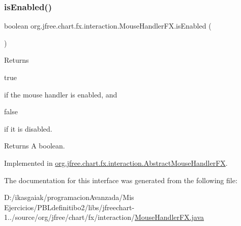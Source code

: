 \subsubsection{\texorpdfstring{is\+Enabled()}{isEnabled()}}
{\footnotesize\ttfamily boolean org.\+jfree.\+chart.\+fx.\+interaction.\+Mouse\+Handler\+F\+X.\+is\+Enabled (\begin{DoxyParamCaption}{ }\end{DoxyParamCaption})}

Returns
\begin{DoxyCode}
\textcolor{keyword}{true} 
\end{DoxyCode}
 if the mouse handler is enabled, and 
\begin{DoxyCode}
\textcolor{keyword}{false} 
\end{DoxyCode}
 if it is disabled.

\begin{DoxyReturn}{Returns}
A boolean. 
\end{DoxyReturn}


Implemented in \mbox{\hyperlink{classorg_1_1jfree_1_1chart_1_1fx_1_1interaction_1_1_abstract_mouse_handler_f_x_a231b7ea733036ba44a5c610184f5b1b0}{org.\+jfree.\+chart.\+fx.\+interaction.\+Abstract\+Mouse\+Handler\+FX}}.



The documentation for this interface was generated from the following file\+:\begin{DoxyCompactItemize}
\item 
D\+:/ikasgaiak/programacion\+Avanzada/\+Mis Ejercicios/\+P\+B\+Ldefinitibo2/libs/jfreechart-\/1../source/org/jfree/chart/fx/interaction/\mbox{\hyperlink{_mouse_handler_f_x_8java}{Mouse\+Handler\+F\+X.\+java}}\end{DoxyCompactItemize}
